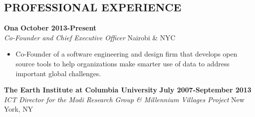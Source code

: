 \documentclass{res}
\begin{document}
\thispagestyle{empty} %

\address{ 748 Tende Drive \\   Nairobi, Kenya \\ +254.725.640.695}      
                                      
\address{mberg@ona.io}

\begin{resume}
 
\section{PROFESSIONAL EXPERIENCE} 

\vspace{8pt}
\textbf{Ona} \hfill        \textbf{October 2013-Present} \\
\emph{Co-Founder and Chief Executive Officer}       \hfill   Nairobi \& NYC

\begin{itemize} \itemsep -2pt %
	\item Co-Founder of a software engineering and design firm that develops open source tools to help organizations make smarter use of data to address important global challenges.

 \end{itemize} \vspace{-4pt}

\vspace{8pt}
\textbf{The Earth Institute at Columbia University} \hfill        \textbf{July 2007-September 2013} \\
\emph{ICT Director for the Modi Research Group \& Millennium Villages Project}       \hfill   New York, NY


\end{resume}
\end{document}
